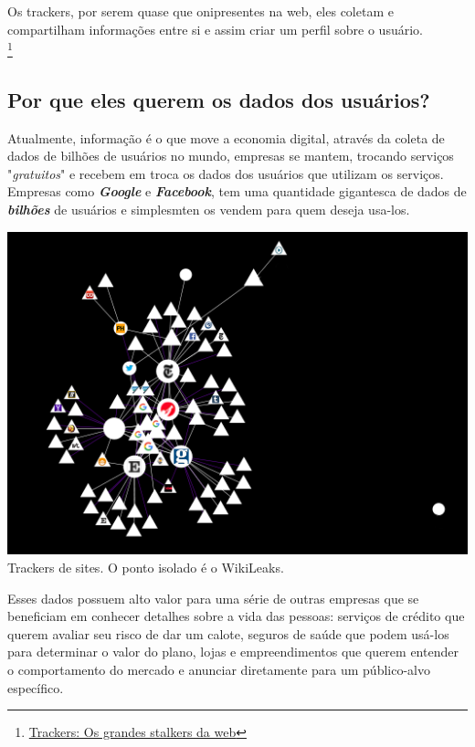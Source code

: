 \documentclass[12pt, letterpaper, Monospace:12]{report}
\begin{document}
	Os trackers, por serem quase que onipresentes na web, eles coletam e compartilham informações entre si e assim criar um perfil sobre o usuário.\\

\footnote{\href{https://antivigilancia.org/pt/2015/11/trackers-os-grandes-stalkers-da-web/}{Trackers: Os grandes stalkers da web}}

\subsection{Por que eles querem os dados dos usuários?}
	Atualmente, informação é o que move a economia digital, através da coleta de dados de bilhões de usuários no mundo, empresas se mantem, trocando serviços "\textit{gratuitos}" e recebem em troca os dados dos usuários que utilizam os serviços. Empresas como \textbf{\textit{Google}} e \textbf{\textit{Facebook}}, tem uma quantidade gigantesca de dados de \textbf{\textit{bilhões}} de usuários e simplesmten os vendem para quem deseja usa-los.\\

	\begin{center} %
		\includegraphics[scale=0.7]{trackers1.png}\\
		\footnotesize Trackers de sites. O ponto isolado é o WikiLeaks.
	\end{center}


	Esses dados possuem alto valor para uma série de outras empresas que se beneficiam em conhecer detalhes sobre a vida das pessoas: serviços de crédito que querem avaliar seu risco de dar um calote, seguros de saúde que podem usá-los para determinar o valor do plano, lojas e empreendimentos que querem entender o comportamento do mercado e anunciar diretamente para um público-alvo específico.\\
\end{document}
